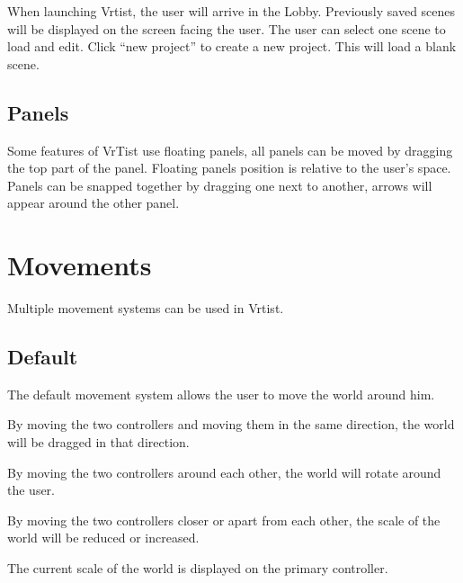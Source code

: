 \documentclass[letterpaper,10pt,english,openany,oneside]{sphinxmanual}
\let\sphinxpxdimen\pdfpxdimen\else\newdimen\sphinxpxdimen
\begin{document}
\sphinxAtStartPar
When launching Vrtist, the user will arrive in the Lobby.
Previously saved scenes will be displayed on the screen facing the user.
The user can select one scene to load and edit.
Click “new project” to create a new project. This will load a blank scene.


\subsection{Panels}
\label{\detokenize{Basics/Basics:panels}}
\sphinxAtStartPar
Some features of VrTist use floating panels, all panels can be moved by dragging the top part of the panel. Floating panels position is relative to the user’s space.
Panels can be snapped together by dragging one next to another, arrows will appear around the other panel.


\section{Movements}
\label{\detokenize{Basics/Movements:movements}}\label{\detokenize{Basics/Movements::doc}}
\noindent{\hspace*{\fill}\sphinxincludegraphics[width=300\sphinxpxdimen]{{paletteMovement}.png}\hspace*{\fill}}

\begin{DUlineblock}{0em}
\item[] 
\end{DUlineblock}

\sphinxAtStartPar
Multiple movement systems can be used in Vrtist.


\subsection{Default}
\label{\detokenize{Basics/Movements:default}}
\begin{DUlineblock}{0em}
\item[] The default movement system allows the user to move the world around him.
\item[] By moving the two controllers and moving them in the same direction, the world will be dragged in that direction.
\item[] By moving the two controllers around each other, the world will rotate around the user.
\item[] By moving the two controllers closer or apart from each other, the scale of the world will be reduced or increased.
\item[] The current scale of the world is displayed on the primary controller.
\end{DUlineblock}
\end{document}
